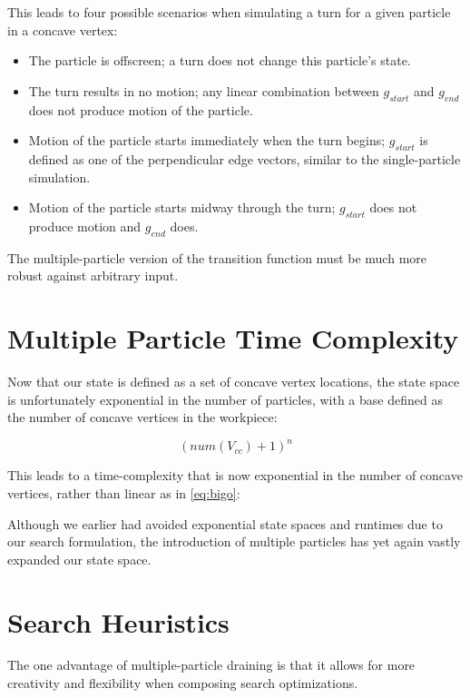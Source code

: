 This leads to four possible scenarios when simulating a turn for a given particle in a concave vertex:

\begin{itemize}
\item The particle is offscreen; a turn does not change this particle's state.
\item The turn results in no motion; any linear combination between $g_{start}$ and $g_{end}$ does not produce motion of the particle.
\item Motion of the particle starts immediately when the turn begins; $g_{start}$ is defined as one of the perpendicular edge vectors, similar to the single-particle simulation.
\item Motion of the particle starts midway through the turn; $g_{start}$ does not produce motion and $g_{end}$ does.
\end{itemize}

The multiple-particle version of the transition function must be much more robust against arbitrary input.

\section{Multiple Particle Time Complexity}

Now that our state is defined as a set of concave vertex locations, the state space is unfortunately exponential in the number of particles, with a base defined as the number of concave vertices in the workpiece:

$$
(num(V_{cc}) + 1)^n
$$

This leads to a time-complexity that is now exponential in the number of concave vertices, rather than linear as in \eqref{eq:bigo}:

 {
  \label{eq:bigoTotal}
}

Although we earlier had avoided exponential state spaces and runtimes due to our search formulation, the introduction of multiple particles has yet again vastly expanded our state space.

\section{Search Heuristics}

The one advantage of multiple-particle draining is that it allows for more creativity and flexibility when composing search optimizations.

